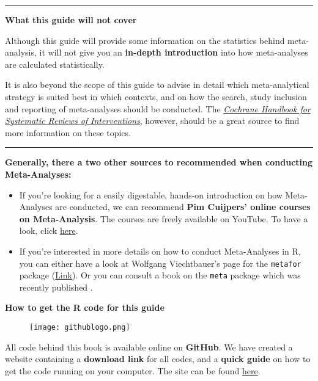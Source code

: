 \documentclass[]{book}
\providecommand{\tightlist}{%
  \setlength{\itemsep}{0pt}\setlength{\parskip}{0pt}}
\theoremstyle{definition}
\theoremstyle{definition}
\theoremstyle{definition}
\theoremstyle{remark}
\begin{document}
\begin{center}\rule{0.5\linewidth}{\linethickness}\end{center}

\textbf{What this guide will not cover}

Although this guide will provide some information on the statistics
behind meta-analysis, it will not give you an \textbf{in-depth
introduction} into how meta-analyses are calculated statistically.

It is also beyond the scope of this guide to advise in detail which
meta-analytical strategy is suited best in which contexts, and on how
the search, study inclusion and reporting of meta-analyses should be
conducted. The \href{http://handbook-5-1.cochrane.org/}{\emph{Cochrane
Handbook for Systematic Reviews of Interventions}}, however, should be a
great source to find more information on these topics.

\begin{center}\rule{0.5\linewidth}{\linethickness}\end{center}

\textbf{Generally, there a two other sources to recommended when
conducting Meta-Analyses:}

\begin{itemize}
\tightlist
\item
  If you're looking for a easily digestable, hands-on introduction on
  how Meta-Analyses are conducted, we can recommend \textbf{Pim
  Cuijpers' online courses on Meta-Analysis}. The courses are freely
  available on YouTube. To have a look, click
  \href{https://www.youtube.com/watch?v=pP7_VBrG_TY\&list=PL-h5cI5Bkvt0J-O0kq_9J9_aksWFPgR7s}{here}.
\item
  If you're interested in more details on how to conduct Meta-Analyses
  in R, you can either have a look at Wolfgang Viechtbauer's page for
  the \texttt{metafor} package
  (\href{http://metafor-project.org}{Link}). Or you can consult a book
  on the \texttt{meta} package which was recently published
  \citep{schwarzer2015meta}.
\end{itemize}

\begin{rmdinfo}
\textbf{How to get the R code for this guide}

\begin{figure}
\centering
\texttt{[image: githublogo.png]}
\caption{}
\end{figure}

All code behind this book is available online on \textbf{GitHub}. We
have created a website containing a \textbf{download link} for all
codes, and a \textbf{quick guide} on how to get the code running on your
computer. The site can be found
\href{https://mathiasharrer.github.io/Doing-Meta-Analysis-in-R/}{here}.
\end{rmdinfo}
\end{document}
